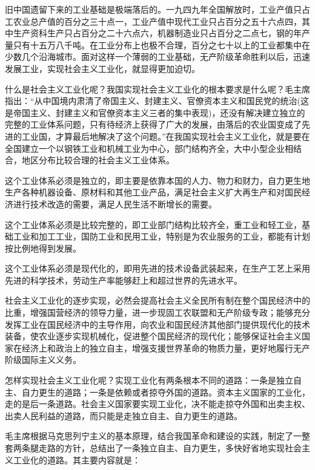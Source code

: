 \documentclass{book}
\begin{document}
旧中国遗留下来的工业基础是极端落后的。一九四九年全国解放时，工业产值只占工农业总产值的百分之三十点一，工业产值中现代工业只占百分之五十六点四，其中生产资科生产只占百分之二十六点六，机器制造业只占百分之二点七，钢的年产量只有十五万八千吨。在工业分布上也极不合理，百分之七十以上的工业都集中在少数几个沿海城市。面对这样一个薄弱的工业基础，无产阶级革命胜利以后，迅速发展工业，实现社会主义工业化，就显得更加迫切。

什么是社会主义工业化呢？我国实现社会主义工业化的根本要求是什么呢？毛主席指出：“从中国境内肃清了帝国主义、封建主义、官僚资本主义和国民党的统治(这是帝国主义、封建主义和官僚资本主义三者的集中表现)，还没有解决建立独立的完整的工业体系问题，只有待经济上获得了广大的发展，由落后的农业国变成了先进的工业国，才算最后地解决了这个问题。”在我国实现社会主义工业化，就是要在全国建立一个以钢铁工业和机械工业为中心，部门结构齐全，大中小型企业相结合，地区分布比较合理的社会主义工业体系。

这个工业体系必须是独立的，即主要是依靠本国的人力、物力和财力，自力更生地生产各种机器设备、原材料和其他工业产品，满足社会主义扩大再生产和对国民经济进行技术改造的需要，满足人民生活不断增长的需要。

这个工业体系必须是比较完整的，即工业部门结构比较齐全，重工业和轻工业，基础工业和加工工业，国防工业和民用工业，特别是为农业服务的工业，都能有计划按比例地得到发展。

这个工业体系必须是现代化的，即用先进的技术设备武装起来，在生产工艺上采用先进的科学技术，劳动生产率能够赶上和超过世界的先进水平。

社会主义工业化的逐步实现，必然会提高社会主义全民所有制在整个国民经济中的比重，增强国营经济的领导力量，进一步现固工农联盟和无产阶级专政；能够充分发挥工业在国民经济中的主导作用，向农业和国民经济其他部门提供现代化的技术装备，使农业逐步实现机械化，促进整个国民经济的现代化；能够保证社会主义国家在经济上和政治上的独立自主，增强支援世界革命的物质力量，更好地履行无产阶级国际主义义务。

怎样实现社会主义工业化呢？实现工业化有两条根本不同的道路：一条是独立自主、自力更生的道路；一条是依赖或者掠夺外国的道路。资本主义国家的工业化，走的是后一条道路。社会主义国家要实现工业化，决不能走掠夺外国和出卖主权、出卖人民利益的道路，而只能是走独立自主、自力更生的道路。

毛主席根据马克思列宁主义的基本原理，结合我国革命和建设的实践，制定了一整套两条腿走路的方针，总结出了一条独立自主、自力更生，多快好省地实现社会主义工业化的道路。其主要内容就是：
\end{document}
